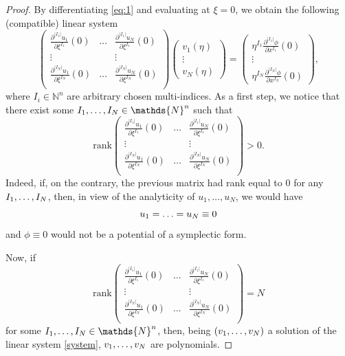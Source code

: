 \documentclass[10pt,a4paper]{amsart}
\newcommand{\N}{\mathds{N}}
\newcommand{\de}{\partial}
\begin{document}
\begin{proof}
By differentiating \eqref{eq:1} and evaluating at $\xi=0$, we obtain the following (compatible) linear system
\begin{equation}\label{system}
\begin{pmatrix}
\frac{\de^{|I_1|} u_1}{\de\xi^{I_1}}(0) &\dots&\frac{\de^{|I_1|}  u_N}{\de\xi^{I_1}}(0) \\
\vdots& &\vdots\\
\frac{\de^{|I_N|}  u_1}{\de\xi^{I_N}}(0) &\dots&\frac{\de^{|I_N|}  u_N}{\de\xi^{I_N}}(0) \\
\end{pmatrix}
\begin{pmatrix}
v_1(\eta)\\
\vdots\\
v_N(\eta)
\end{pmatrix}
=\begin{pmatrix}
\eta^{I_1}\frac{\de^{|I_1|}  \phi}{\de x^{I_1}}(0)\\
\vdots\\
\eta^{I_N}\frac{\de^{|I_N|}  \phi}{\de x^{I_N}}(0)
\end{pmatrix},
\end{equation}
where $I_i\in\N^n$ are arbitrary chosen multi-indices. As a first step, we notice that there exist some $I_1,\mathellipsis,I_N\in\N^n$ such that
$$\mathrm{rank} \begin{pmatrix}
\frac{\de^{|I_1|} u_1}{\de\xi^{I_1}}(0) &\dots&\frac{\de^{|I_1|} u_N}{\de\xi^{I_1}}(0) \\
\vdots& &\vdots\\
\frac{\de^{|I_N|} u_1}{\de\xi^{I_N}}(0) &\dots&\frac{\de^{|I_N|} u_N}{\de\xi^{I_N}}(0) \\
\end{pmatrix}>0.
$$ 
Indeed, if, on the contrary, the previous matrix had rank equal to 0 for any $I_1,\mathellipsis,I_N$, then, in view of the analyticity of $u_1,\dots,u_N$, we would have
$$u_1=\mathellipsis=u_N\equiv 0$$  and $\phi\equiv0$ would  not be a potential of a symplectic form.

\smallskip\noindent
Now, if
$$\mathrm{rank} \begin{pmatrix}
\frac{\de^{|I_1|}  u_1}{\de\xi^{I_1}}(0) &\dots&\frac{\de^{|I_1|}  u_N}{\de\xi^{I_1}}(0) \\
\vdots& &\vdots\\
\frac{\de^{|I_N|}  u_1}{\de\xi^{I_N}}(0) &\dots&\frac{\de^{|I_N|}  u_N}{\de\xi^{I_N}}(0) \\
\end{pmatrix}=N$$
for some $I_1,\mathellipsis,I_N\in\N^n$, then, being $(v_1,\mathellipsis,v_N)$ a solution of the linear system \eqref{system}, $v_1,\mathellipsis,v_N$ are polynomials.



\end{proof}
\end{document}
